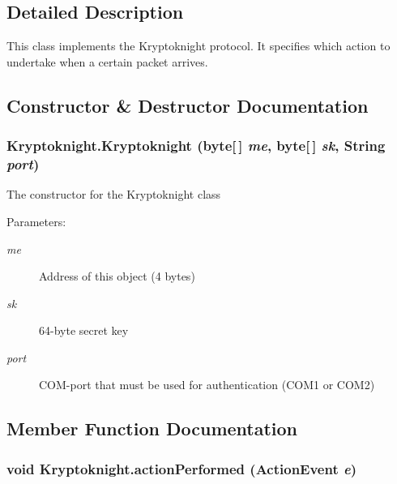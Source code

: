 \subsection{Detailed Description}
This class implements the Kryptoknight protocol. It specifies which action to undertake when a certain packet arrives. 



\subsection{Constructor \& Destructor Documentation}
\hypertarget{class_kryptoknight_a0}{
\subsubsection[Kryptoknight]{\setlength{\rightskip}{0pt plus 5cm}Kryptoknight.Kryptoknight (byte\mbox{[}$\,$\mbox{]} {\em me}, byte\mbox{[}$\,$\mbox{]} {\em sk}, String {\em port})}}
\label{class_kryptoknight_a0}


The constructor for the Kryptoknight class \begin{Desc}
\item[Parameters:]
\begin{description}
\item[{\em me}]Address of this object (4 bytes) \item[{\em sk}]64-byte secret key \item[{\em port}]COM-port that must be used for authentication (COM1 or COM2) \end{description}
\end{Desc}


\subsection{Member Function Documentation}
\hypertarget{class_kryptoknight_a1}{
\subsubsection[actionPerformed]{\setlength{\rightskip}{0pt plus 5cm}void Kryptoknight.action\-Performed (Action\-Event {\em e})}}
\label{class_kryptoknight_a1}


